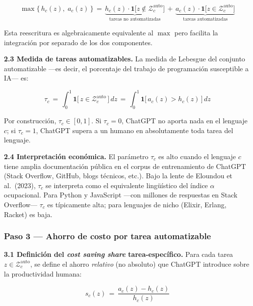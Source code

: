\documentclass[11pt,a4paper]{article}
\theoremstyle{definition}
\begin{document}
\begin{equation}
\max\!\bigl\{\,h_c(z),\; a_c(z)\,\bigr\} \,=\,
\underbrace{h_c(z)\cdot\mathbf{1}\!\bigl[z \notin \mathcal{Z}_c^{\text{auto}}\bigr]}_{\text{tareas no automatizadas}}
\,+\,
\underbrace{a_c(z)\cdot\mathbf{1}\!\bigl[z \in \mathcal{Z}_c^{\text{auto}}\bigr]}_{\text{tareas automatizadas}}
\label{eq:paso2_max}
\end{equation}

Esta reescritura es algebraicamente equivalente al $\max$ pero facilita la integración por separado de los dos componentes.

\textbf{2.3 Medida de tareas automatizables.} La medida de Lebesgue del conjunto automatizable ---es decir, el porcentaje del trabajo de programación susceptible a IA--- es:

\begin{equation}
\tau_c \,=\, \int_0^1 \mathbf{1}\!\bigl[\, z \in \mathcal{Z}_c^{\text{auto}}\, \bigr]\, dz \,=\, \int_0^1 \mathbf{1}\!\bigl[\, a_c(z) > h_c(z)\, \bigr]\, dz
\label{eq:tauc}
\end{equation}

Por construcción, $\tau_c \in [0, 1]$. Si $\tau_c = 0$, ChatGPT no aporta nada en el lenguaje $c$; si $\tau_c = 1$, ChatGPT supera a un humano en absolutamente toda tarea del lenguaje.

\textbf{2.4 Interpretación económica.} El parámetro $\tau_c$ es alto cuando el lenguaje $c$ tiene amplia documentación pública en el corpus de entrenamiento de ChatGPT (Stack Overflow, GitHub, blogs técnicos, etc.). Bajo la lente de Eloundou et al.\ (2023), $\tau_c$ se interpreta como el equivalente lingüístico del índice $\alpha$ ocupacional. Para Python y JavaScript ---con millones de respuestas en Stack Overflow--- $\tau_c$ es típicamente alta; para lenguajes de nicho (Elixir, Erlang, Racket) es baja.

\subsubsection*{Paso 3 --- Ahorro de costo por tarea automatizable}

\textbf{3.1 Definición del \textit{cost saving share} tarea-específico.} Para cada tarea $z \in \mathcal{Z}_c^{\text{auto}}$, se define el ahorro \textit{relativo} (no absoluto) que ChatGPT introduce sobre la productividad humana:

\begin{equation}
s_c(z) \,=\, \frac{a_c(z) - h_c(z)}{h_c(z)}
\label{eq:ahorro}
\end{equation}
\end{document}
